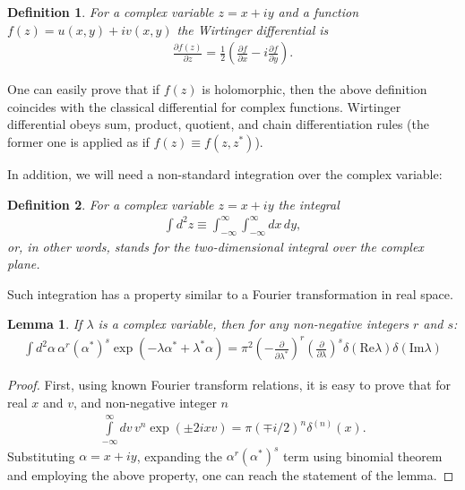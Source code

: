 \documentclass[12pt,aip,jmp,amssymb,amsmath]{revtex4-1}
\newtheorem{definition}{Definition}
\newtheorem{lemma}{Lemma}
\begin{document}
\begin{definition}
    For a complex variable $z = x + iy$ and a function $f(z) = u(x, y) + iv(x, y)$ the Wirtinger differential is
    \begin{eqnarray*}
        \frac{\partial f(z)}{\partial z}
        = \frac{1}{2} \left(
            \frac{\partial f}{\partial x} - i \frac{\partial f}{\partial y}
        \right).
    \end{eqnarray*}
\end{definition}

One can easily prove that if $f(z)$ is holomorphic, then the above definition coincides with the classical differential for complex functions.
Wirtinger differential obeys sum, product, quotient, and chain differentiation rules (the former one is applied as if $f(z) \equiv f(z, z^*)$).

In addition, we will need a non-standard integration over the complex variable:

\begin{definition}
    For a complex variable $z = x + iy$ the integral
    \begin{eqnarray*}
        \int d^2 z \equiv \int_{-\infty}^{\infty} \int_{-\infty}^{\infty} dx\, dy,
    \end{eqnarray*}
    or, in other words, stands for the two-dimensional integral over the complex plane.
\end{definition}

Such integration has a property similar to a Fourier transformation in real space.

\begin{lemma}
\label{lmm:c-numbers:fourier-of-moments}
    If $\lambda$ is a complex variable, then for any non-negative integers $r$ and $s$:
    \begin{eqnarray*}
        \int d^2\alpha\, \alpha^r (\alpha^*)^s \exp(-\lambda \alpha^* + \lambda^* \alpha)
        = \pi^2
            \left( -\frac{\partial}{\partial \lambda^*} \right)^r
            \left( \frac{\partial}{\partial \lambda} \right)^s
            \delta(\mathrm{Re} \lambda) \delta(\mathrm{Im} \lambda)
    \end{eqnarray*}
\end{lemma}
\begin{proof}
First, using known Fourier transform relations, it is easy to prove that for real $x$ and $v$, and non-negative integer $n$
\begin{eqnarray*}
    \int\limits_{-\infty}^{\infty} dv\, v^n \exp(\pm 2 i x v)
    = \pi (\mp i / 2)^n \delta^{(n)}(x).
\end{eqnarray*}
Substituting $\alpha = x + iy$, expanding the $\alpha^r (\alpha^*)^s$ term using binomial theorem and employing the above property, one can reach the statement of the lemma.
\end{proof}
\end{document}
